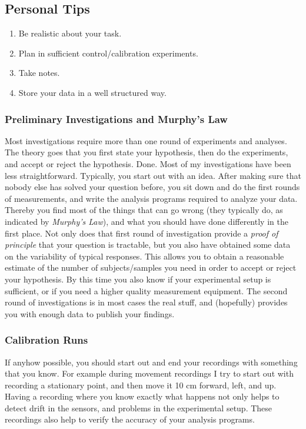 \subsection{Personal Tips}

\begin{enumerate}
  \item Be realistic about your task.
  \item Plan in sufficient control/calibration experiments.
  \item Take notes.
  \item Store your data in a well structured way.
\end{enumerate}

\subsubsection{Preliminary Investigations and Murphy's Law}
Most investigations require more than one round of experiments and analyses. The theory goes that you first state your hypothesis, then do the experiments, and accept or reject the hypothesis. Done.
Most of my investigations have been less straightforward. Typically, you start out with an idea. After making sure that nobody else has solved your question before, you sit down and do the first rounds of measurements, and write the analysis programs required to analyze your data. Thereby you find most of the things that can go wrong (they typically do, as indicated by \emph{Murphy's Law}), and what you should have done differently in the first place. Not only does that first round of investigation provide a \emph{proof of principle} that your question is tractable, but you also have obtained some data on the variability of typical responses. This allows you to obtain a reasonable estimate of the number of subjects/samples you need in order to accept or reject your hypothesis. By this time you also know if your experimental setup is sufficient, or if you need a higher quality measurement equipment. The second round of investigations is in most cases the real stuff, and (hopefully) provides you with enough data to publish your findings.

\subsubsection{Calibration Runs}
If anyhow possible, you should start out and end your recordings with something that you know. For example during movement recordings I try to start out with recording a stationary point, and then move it 10 cm forward, left, and up. Having a recording where you know exactly what happens not only helps to detect drift in the sensors, and problems in the experimental setup. These recordings also help to verify the accuracy of your analysis programs.

